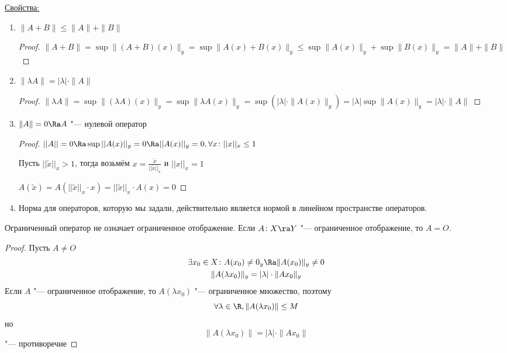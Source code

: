\underline{Свойства:}
\begin{enumerate}
\item
	$\|A + B\| \le \|A\| + \|B\|$
	\begin{proof}
		$\|A + B\| = \sup \|(A + B)(x)\|_y = \sup \|A(x) + B(x)\|_y \le \sup \|A(x)\|_y + \sup \|B(x)\|_y = \|A\| + \|B\|$
	\end{proof}

\item
	$\|\lambda A\| = |\lambda| \cdot \|A\|$
	\begin{proof}
		$\|\lambda A\| = \sup \| (\lambda A)(x) \|_y = \sup \| \lambda A(x) \|_y = \sup( |\lambda| \cdot \|A(x) \|_y) = |\lambda| \sup \|A(x)\|_y = |\lambda| \cdot \|A\|$
	\end{proof}

\item
	$\|A\| = 0 \Ra A$ "--- нулевой оператор
	\begin{proof}
		$||A|| = 0 \Ra \sup ||A(x)||_y = 0 \Ra ||A(x)||_y = 0, \forall x \colon ||x||_x \le 1$
		
		Пусть $||\widetilde{x}||_x > 1$, тогда возьмём $x = \frac{\widetilde{x}}{||\widetilde{x}||_x}$ и $||x||_x = 1$
		
		$A(\widetilde{x}) = A(||\widetilde{x}||_x \cdot x) = ||\widetilde{x}||_x \cdot A(x) = 0$
	\end{proof}

\item
	Норма для операторов, которую мы задали, действительно является нормой в линейном пространстве операторов.
\end{enumerate}

\begin{Rem}
	Ограниченный оператор не означает ограниченное отображение. Если $A \colon X \ra Y$ "--- ограниченное отображение, то $A = O$.
\end{Rem}
\begin{proof}
	Пусть $A \ne O$
	\begin{gather*}
		\exists x_0 \in X \colon A(x_0) \ne 0_y \Ra \|A(x_0)\|_y \ne 0 \\
		\|A(\lambda x_0)\|_y = |\lambda| \cdot \|Ax_0\|_y
	\end{gather*}
	Если $A$ "--- ограниченное отображение, то $A(\lambda x_0)$ "--- ограниченное множество, поэтому
	\[ \forall \lambda \in \R, \|A(\lambda x_0)\| \le M \]
	но
	\[ \|A(\lambda x_0)\| = |\lambda| \cdot \|Ax_0\| \]
	"--- противоречие
\end{proof}


